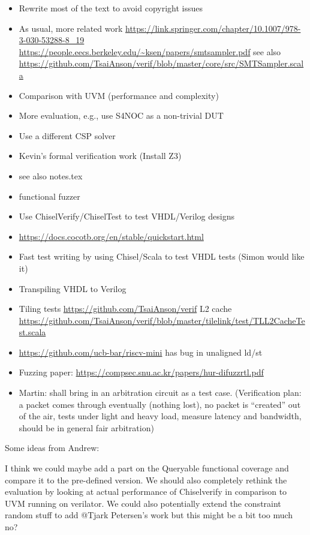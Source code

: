 \documentclass[conference]{IEEEtran}
\newcommand{\martin}[1]{{\color{blue} Martin: #1}}
\begin{document}
\begin{itemize}
\item Rewrite most of the text to avoid copyright issues
\item As usual, more related work \url{https://link.springer.com/chapter/10.1007/978-3-030-53288-8_19} \url{https://people.eecs.berkeley.edu/~ksen/papers/smtsampler.pdf} see also \url{https://github.com/TsaiAnson/verif/blob/master/core/src/SMTSampler.scala}
\item Comparison with UVM (performance and complexity)
\item More evaluation, e.g., use S4NOC as a non-trivial DUT
\item Use a different CSP solver
\item Kevin's formal verification work (Install Z3)
\item see also notes.tex
\item functional fuzzer
\item Use ChiselVerify/ChiselTest to test VHDL/Verilog designs
\item \url{https://docs.cocotb.org/en/stable/quickstart.html}
\item Fast test writing by using Chisel/Scala to test VHDL tests (Simon would like it)
\item Transpiling VHDL to Verilog
\item Tiling tests \url{https://github.com/TsaiAnson/verif} L2 cache \url{https://github.com/TsaiAnson/verif/blob/master/tilelink/test/TLL2CacheTest.scala}
\item \url{https://github.com/ucb-bar/riscv-mini} has bug in unaligned ld/st
\item Fuzzing paper: \url{https://compsec.snu.ac.kr/papers/hur-difuzzrtl.pdf}
\item \martin{shall bring in an arbitration circuit as a test case.} (Verification plan: a packet comes through eventually (nothing lost), no packet is ``created'' out of the air, tests under light and heavy load, measure latency and bandwidth, should be in general fair arbitration)
\end{itemize}

Some ideas from Andrew:

I think we could maybe add a part on the Queryable functional coverage and compare it to the pre-defined version. We should also completely rethink the evaluation by looking at actual performance of Chiselverify in comparison to UVM running on verilator. We could also potentially extend the constraint random stuff to add @Tjark Petersen's work but this might be a bit too much no?
\end{document}
